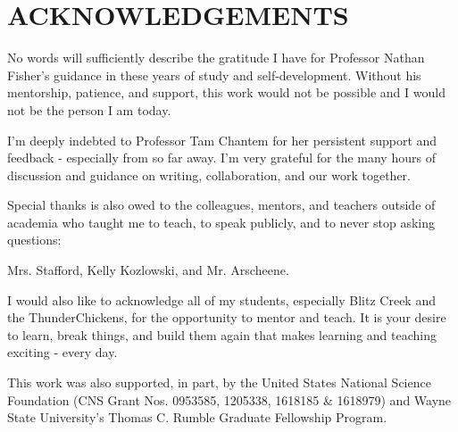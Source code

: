\section*{ACKNOWLEDGEMENTS}
\begin{center}
No words will sufficiently describe the gratitude I have for Professor Nathan Fisher's guidance in these years of study and self-development.
Without his mentorship, patience, and support, this work would not be possible and I would not be the person I am today.

I'm deeply indebted to Professor Tam Chantem for her persistent support and feedback - especially from so far away.
I'm very grateful for the many hours of discussion and guidance on writing, collaboration, and our work together.

Special thanks is also owed to the colleagues, mentors, and teachers outside of academia who taught me to teach, to speak publicly, and to never stop asking questions:

Mrs. Stafford,
Kelly Kozlowski,
and Mr. Arscheene.

I would also like to acknowledge all of my students, especially Blitz Creek and the ThunderChickens, for the opportunity to mentor and teach.
It is your desire to learn, break things, and build them again that makes learning and teaching exciting - every day.

This work was also supported, in part, by the United States National Science Foundation
(CNS Grant Nos. 0953585, 1205338, 1618185 \& 1618979) and Wayne State University's Thomas C. Rumble Graduate Fellowship Program.

\end{center}